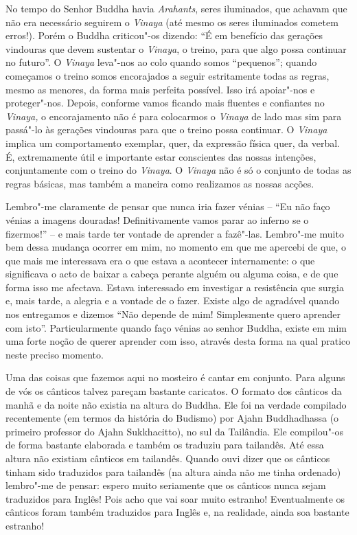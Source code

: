 No tempo do Senhor Buddha havia \emph{Arahants}, seres iluminados, que
achavam que não era necessário seguirem o \emph{Vinaya} (até mesmo os
seres iluminados cometem erros!). Porém o Buddha criticou"-os dizendo:
``É em benefício das gerações vindouras que devem sustentar o
\emph{Vinaya}, o treino, para que algo possa continuar no futuro''. O
\emph{Vinaya} leva"-nos ao colo quando somos ``pequenos''; quando
começamos o treino somos encorajados a seguir estritamente todas as
regras, mesmo as menores, da forma mais perfeita possível. Isso irá
apoiar"-nos e proteger"-nos. Depois, conforme vamos ficando mais fluentes
e confiantes no \emph{Vinaya,} o encorajamento não é para colocarmos o
\emph{Vinaya} de lado mas sim para passá"-lo às gerações vindouras para
que o treino possa continuar. O \emph{Vinaya} implica um comportamento
exemplar, quer, da expressão física quer, da verbal. É, extremamente
útil e importante estar conscientes das nossas intenções, conjuntamente
com o treino do \emph{Vinaya}. O \emph{Vinaya} não é só o conjunto de
todas as regras básicas, mas também a maneira como realizamos as nossas
acções.

Lembro"-me claramente de pensar que nunca iria fazer vénias -- ``Eu não
faço vénias a imagens douradas! Definitivamente vamos parar ao inferno
se o fizermos!'' -- e mais tarde ter vontade de aprender a fazê"-las.
Lembro"-me muito bem dessa mudança ocorrer em mim, no momento em que me
apercebi de que, o que mais me interessava era o que estava a acontecer
internamente: o que significava o acto de baixar a cabeça perante alguém
ou alguma coisa, e de que forma isso me afectava. Estava interessado em
investigar a resistência que surgia e, mais tarde, a alegria e a vontade
de o fazer. Existe algo de agradável quando nos entregamos e dizemos
``Não depende de mim! Simplesmente quero aprender com isto''.
Particularmente quando faço vénias ao senhor Buddha, existe em mim uma
forte noção de querer aprender com isso, através desta forma na qual
pratico neste preciso momento.

Uma das coisas que fazemos aqui no mosteiro é cantar em conjunto. Para
alguns de vós os cânticos talvez pareçam bastante caricatos. O formato
dos cânticos da manhã e da noite não existia na altura do Buddha. Ele
foi na verdade compilado recentemente (em termos da história do Budismo)
por Ajahn Buddhadhassa (o primeiro professor do Ajahn Sukkhacitto), no
sul da Tailândia. Ele compilou"-os de forma bastante elaborada e também
os traduziu para tailandês. Até essa altura não existiam cânticos em
tailandês. Quando ouvi dizer que os cânticos tinham sido traduzidos para
tailandês (na altura ainda não me tinha ordenado) lembro"-me de pensar:
espero muito seriamente que os cânticos nunca sejam traduzidos para
Inglês! Pois acho que vai soar muito estranho! Eventualmente os cânticos
foram também traduzidos para Inglês e, na realidade, ainda soa bastante
estranho!

